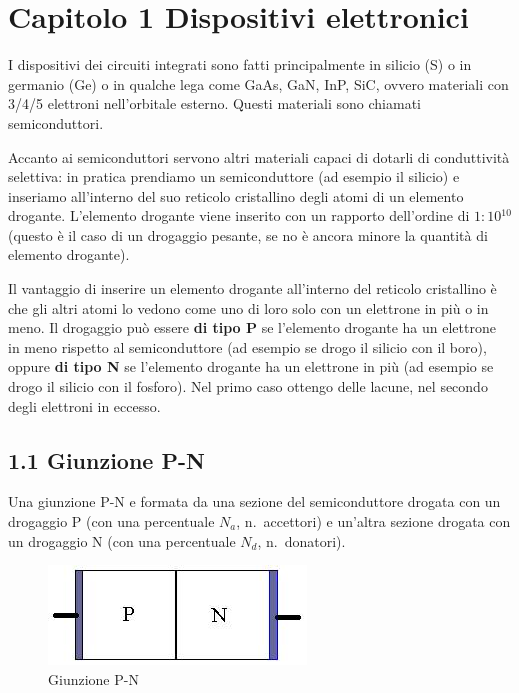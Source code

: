 \documentclass[
]{article}
\author{}
\date{}
\begin{document}
{
\setcounter{tocdepth}{3}
\tableofcontents
}
\newpage

\section{Capitolo 1 Dispositivi
elettronici}\label{capitolo-1-dispositivi-elettronici}

I dispositivi dei circuiti integrati sono fatti principalmente in
silicio (S) o in germanio (Ge) o in qualche lega come GaAs, GaN, InP,
SiC, ovvero materiali con 3/4/5 elettroni nell'orbitale esterno. Questi
materiali sono chiamati semiconduttori.

Accanto ai semiconduttori servono altri materiali capaci di dotarli di
conduttività selettiva: in pratica prendiamo un semiconduttore (ad
esempio il silicio) e inseriamo all'interno del suo reticolo cristallino
degli atomi di un elemento drogante. L'elemento drogante viene inserito
con un rapporto dell'ordine di \(1:10{}^{10}\) (questo è il caso di un
drogaggio pesante, se no è ancora minore la quantità di elemento
drogante).

Il vantaggio di inserire un elemento drogante all'interno del reticolo
cristallino è che gli altri atomi lo vedono come uno di loro solo con un
elettrone in più o in meno. Il drogaggio può essere \textbf{di tipo P}
se l'elemento drogante ha un elettrone in meno rispetto al
semiconduttore (ad esempio se drogo il silicio con il boro), oppure
\textbf{di tipo N} se l'elemento drogante ha un elettrone in più (ad
esempio se drogo il silicio con il fosforo). Nel primo caso ottengo
delle lacune, nel secondo degli elettroni in eccesso.

\subsection{1.1 Giunzione P-N}\label{giunzione-p-n}

Una giunzione P-N e formata da una sezione del semiconduttore drogata
con un drogaggio P (con una percentuale \(N_{a}\), n.~accettori) e
un'altra sezione drogata con un drogaggio N (con una percentuale
\(N_{d}\), n.~donatori).

\begin{figure}
\centering
\includegraphics[width=\textwidth,height=0.05\textheight]{immagini/0.jpg}
\caption{Giunzione P-N}
\end{figure}
\end{document}
